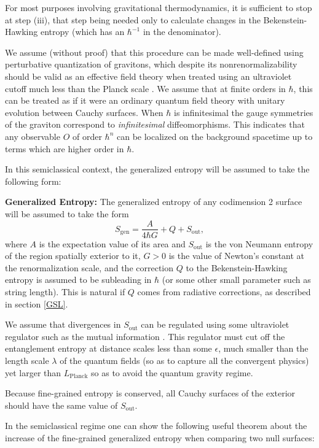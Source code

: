 \documentclass[12pt]{article}
\begin{document}
For most purposes involving gravitational thermodynamics, it is sufficient to stop at step (iii), that step being needed only to calculate changes in the Bekenstein-Hawking entropy (which has an $\hbar^{-1}$ in the denominator).

We assume (without proof) that this procedure can be made well-defined using perturbative quantization of gravitons, which despite its nonrenormalizability should be valid as an effective field theory when treated using an ultraviolet cutoff much less than the Planck scale \cite{burgess}.  We assume that at finite orders in $\hbar$, this can be treated as if it were an ordinary quantum field theory with unitary evolution between Cauchy surfaces.  When $\hbar$ is infinitesimal the gauge symmetries of the graviton correspond to \emph{infinitesimal} diffeomorphisms.  This indicates that any observable $O$ of order $\hbar^n$ can be localized on the background spacetime up to terms which are higher order in $\hbar$.

In this semiclassical context, the generalized entropy will be assumed to take the following form:

\textbf{Generalized Entropy:} The generalized entropy of any codimension 2 surface will be assumed to take the form
\begin{equation}
S_\mathrm{gen} = \frac{A}{4 \hbar G} + Q + S_\mathrm{out},
\end{equation}
where $A$ is the expectation value of its area and $S_\mathrm{out}$ is the von Neumann entropy of the region spatially exterior to it, $G > 0$ is the value of Newton's constant at the renormalization scale, and the correction $Q$ to the Bekenstein-Hawking entropy is assumed to be subleading in $\hbar$ (or some other small parameter such as string length).  This is natural if $Q$ comes from radiative corrections, as described in section \ref{GSL}.

We assume that divergences in $S_\mathrm{out}$ can be regulated using some ultraviolet regulator such as the mutual information \cite{Imono}.  This regulator must cut off the entanglement entropy at distance scales less than some $\epsilon$, much smaller than the length scale $\lambda$ of the quantum fields (so as to capture all the convergent physics) yet larger than $L_\mathrm{Planck}$ so as to avoid the quantum gravity regime.

Because fine-grained entropy is conserved, all Cauchy surfaces of the exterior should have the same value of $S_\mathrm{out}$.

In the semiclassical regime one can show the following useful theorem about the increase of the fine-grained generalized entropy when comparing two null surfaces:
\end{document}
